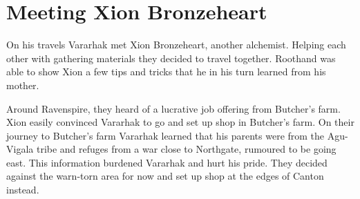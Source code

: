 \section{Meeting Xion Bronzeheart}

On his travels Vararhak met Xion Bronzeheart, another alchemist. Helping each other with gathering materials they decided to travel together. Roothand was able to show Xion a few tips and tricks that he in his turn learned from his mother.

Around Ravenspire, they heard of a lucrative job offering from Butcher's farm. Xion easily convinced Vararhak to go and set up shop in Butcher's farm. On their journey to Butcher's farm Vararhak learned that his parents were from the Agu-Vigala tribe and refuges from a war close to Northgate, rumoured to be going east. This information burdened Vararhak and hurt his pride. They decided against the warn-torn area for now and set up shop at the edges of Canton instead.
